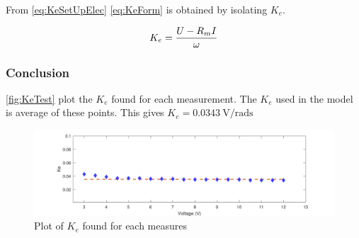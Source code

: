 \startexplain
{}
\stopexplain

From \autoref{eq:KeSetUpElec} \autoref{eq:KeForm} is obtained by isolating $K_e$.

\begin{equation}
K_e=\frac{U-R_m I}{\omega} \addunit{\volt\per\radian\second}
\label{eq:KeForm}
\end{equation}

\subsubsection*{Conclusion}

\autoref{fig:KeTest} plot the $K_e$ found for each measurement. The $K_e$ used in the model is average of these points. This gives $K_e=\SI{0.0343}{\volt\per\radian\second}$

\begin{figure}[htbp]
	\centering
	\includegraphics[width=1.1\textwidth]{figures/appendix/Motor&GearTests/PlotKe}
	\caption{Plot of $K_e$ found for each measures}\label{fig:KeTest}
\end{figure}
